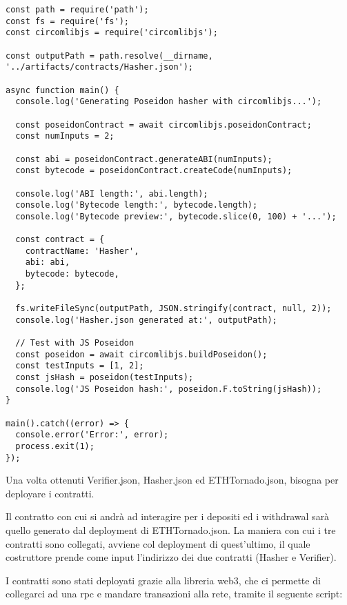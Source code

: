 \begin{lstlisting}
const path = require('path');
const fs = require('fs');
const circomlibjs = require('circomlibjs');

const outputPath = path.resolve(__dirname, '../artifacts/contracts/Hasher.json');

async function main() {
  console.log('Generating Poseidon hasher with circomlibjs...');
  
  const poseidonContract = await circomlibjs.poseidonContract;
  const numInputs = 2;

  const abi = poseidonContract.generateABI(numInputs);
  const bytecode = poseidonContract.createCode(numInputs);

  console.log('ABI length:', abi.length);
  console.log('Bytecode length:', bytecode.length);
  console.log('Bytecode preview:', bytecode.slice(0, 100) + '...');

  const contract = {
    contractName: 'Hasher',
    abi: abi,
    bytecode: bytecode,
  };

  fs.writeFileSync(outputPath, JSON.stringify(contract, null, 2));
  console.log('Hasher.json generated at:', outputPath);

  // Test with JS Poseidon
  const poseidon = await circomlibjs.buildPoseidon();
  const testInputs = [1, 2];
  const jsHash = poseidon(testInputs);
  console.log('JS Poseidon hash:', poseidon.F.toString(jsHash));
}

main().catch((error) => {
  console.error('Error:', error);
  process.exit(1);
});
\end{lstlisting}

Una volta ottenuti Verifier.json, Hasher.json ed ETHTornado.json, bisogna per deployare i contratti.

Il contratto con cui si andrà ad interagire per i depositi ed i withdrawal sarà quello generato dal deployment di ETHTornado.json. La maniera con cui i tre contratti sono collegati, avviene col deployment di quest'ultimo, il quale costruttore prende come input l'indirizzo dei due contratti (Hasher e Verifier).

I contratti sono stati deployati grazie alla libreria web3, che ci permette di collegarci ad una rpc e mandare transazioni alla rete, tramite il seguente script:

